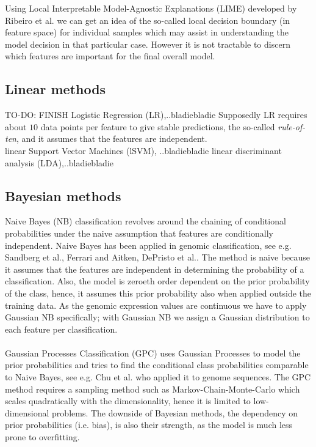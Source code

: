 \documentclass[a4paper,10pt]{article}
\begin{document}
Using Local Interpretable Model-Agnostic Explanations (LIME) developed by Ribeiro et al.\cite{Ribeiro2016} 
we can get an idea of the so-called local decision boundary (in feature space) for individual samples which may assist in
understanding the model decision in that particular case. However it is not tractable to discern which features are important
for the final overall model.
%
\subsection{Linear methods}
%
TO-DO: FINISH 
Logistic Regression (LR),..bladiebladie 
Supposedly LR requires about $10$ data points per feature to give stable predictions, the so-called \textit{rule-of-ten}, and it assumes that
the features are independent. \\ 
%
linear Support Vector Machines (lSVM), ..bladiebladie
linear discriminant analysis (LDA),..bladiebladie
%

\subsection{Bayesian methods}
%
Naive Bayes (NB) classification revolves around the chaining of conditional probabilities under the naive assumption
that features are conditionally independent. Naive Bayes has been applied in genomic classification, see e.g. Sandberg et al.\cite{Sandberg2001}, Ferrari and Aitken\cite{Ferrari2006}, DePristo et al.\cite{DePristo2011}. The method is naive because it assumes that the features are independent in determining the probability of a classification. Also, the model is 
zeroeth order dependent on the prior probability of the class, hence, it assumes this prior probability also when applied
outside the training data. As the genomic expression values are continuous we have to apply Gaussian NB specifically; 
with Gaussian NB we assign a Gaussian distribution to each feature per classification. \\ \\
%
Gaussian Processes Classification (GPC) uses Gaussian Processes to model the prior probabilities and tries to find
the conditional class probabilities comparable to Naive Bayes, see e.g. Chu et al.\cite{Chu2005} who applied it to genome sequences. 
The GPC method requires a sampling method such as Markov-Chain-Monte-Carlo which scales quadratically with the dimensionality, hence it is limited to low-dimensional problems. The downside of Bayesian methods, the dependency on prior probabilities (i.e. bias), is also their strength, as the model is much less prone to overfitting. 
%
\end{document}
